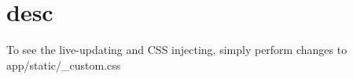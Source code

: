 \chapter{desc}
\hypertarget{md__d_1_2_g_i_t_2_food_link_2foodlink_8client_2node__modules_2bs-recipes_2recipes_2proxy_8custom-css_2desc}{}\label{md__d_1_2_g_i_t_2_food_link_2foodlink_8client_2node__modules_2bs-recipes_2recipes_2proxy_8custom-css_2desc}
To see the live-\/updating and CSS injecting, simply perform changes to {\ttfamily app/static/\+\_\+custom.\+css} 
